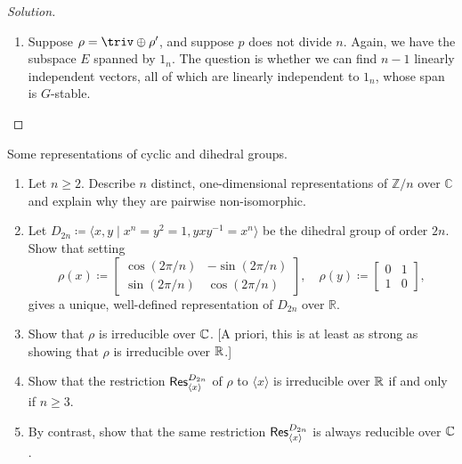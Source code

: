 \begin{proof}[Solution]
\begin{enumerate}[font=\normalfont,label=\textbf{(\alph*)}, wide]
\item Suppose $\rho = \triv \oplus \rho'$, and suppose $p$ does not divide $n$. Again, we have the subspace $E$ spanned by $1_n$. The question is whether we can find $n-1$ linearly independent vectors, all of which are linearly independent to $1_n$, whose span is $G$-stable.

\end{enumerate}
\end{proof}

\newpage



\begin{problem}
Some representations of cyclic and dihedral groups.
\begin{enumerate}[font=\normalfont,label=\textbf{(\alph*)}]
\item Let $n \geq 2$. Describe $n$ distinct, one-dimensional representations of $\mathbb{Z}/n$ over $\mathbb{C}$ and explain why they are pairwise non-isomorphic.

\item Let $D_{2n} \coloneqq \langle x, y \mid x^n = y^2 = 1, yxy^{-1} = x^n \rangle$ be the dihedral group of order $2n$. Show that setting
\[
\rho(x) \coloneqq
\begin{bmatrix}
\cos(2\pi/n) & -\sin(2\pi/n) \\
\sin(2\pi/n) & \cos(2\pi/n)
\end{bmatrix}
, \quad
\rho(y) \coloneqq
\begin{bmatrix}
0 & 1 \\
1 & 0
\end{bmatrix}
,
\]
gives a unique, well-defined representation of $D_{2n}$ over $\mathbb{R}$.

\item Show that $\rho$ is irreducible over $\mathbb{C}$. [A priori, this is at least as strong as showing that $\rho$ is irreducible over $\mathbb{R}$.]

\item Show that the restriction $\mathsf{Res}^{D_{2n}}_{\langle x\rangle}$ of $\rho$ to $\langle x \rangle$ is irreducible over $\mathbb{R}$ if and only if $n\geq 3$.

\item By contrast, show that the same restriction $\mathsf{Res}^{D_{2n}}_{\langle x\rangle}$ is always reducible over $\mathbb{C}$.
\end{enumerate}
\end{problem}

